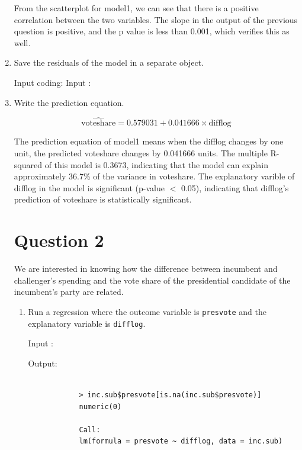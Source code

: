 \documentclass[12pt,letterpaper]{article}
\begin{document}
\begin{enumerate}
	\noindent From the scatterplot for model1, we can see that there is a positive correlation between the two variables. The slope in the output of the previous question is positive, and the p value is less than 0.001, which verifies this as well.
		\vspace{1cm}
		\item Save the residuals of the model in a separate object.
		
		\noindent Input coding:
		 	\noindent Input :
		   
			\vspace{1cm}
			
			
		\item Write the prediction equation.
		
	\begin{equation}
		\hat{\text{{voteshare}}} = 0.579031 + 0.041666 \times \text{{difflog}}
	\end{equation}

	\noindent The prediction equation of model1  means when the difflog changes by one unit, the predicted voteshare changes by 0.041666 units. The multiple R-squared of this model is 0.3673, indicating that the model can explain approximately 36.7\% of the variance in voteshare. The explanatory varible  of difflog in the model is significant (p-value $<$ 0.05), indicating that difflog's prediction of voteshare is statistically significant.

	
\newpage

\section*{Question 2}
\noindent We are interested in knowing how the difference between incumbent and challenger's spending and the vote share of the presidential candidate of the incumbent's party are related.	\vspace{.25cm}
	\begin{enumerate}
		\item Run a regression where the outcome variable is \texttt{presvote} and the explanatory variable is \texttt{difflog}.
		
			\noindent Input :
		  
		
		
		Output:
		\begin{verbatim}
			
			> inc.sub$presvote[is.na(inc.sub$presvote)]
			numeric(0)
			
			Call:
			lm(formula = presvote ~ difflog, data = inc.sub)
			

\end{verbatim}
\end{enumerate}
\end{enumerate}
\end{document}
